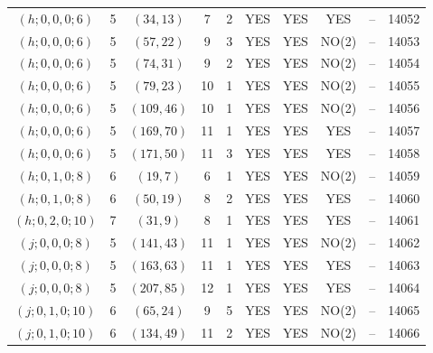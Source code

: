 \begin{longtable}{|c|c|c|c|c|c|c|c|c|c|}
$(h; 0, 0, 0; 6)$ & 5 & $(34, 13)$ & 7 & 2 & YES & YES & YES & -- & 14052\\
$(h; 0, 0, 0; 6)$ & 5 & $(57, 22)$ & 9 & 3 & YES & YES & NO(2) & -- & 14053\\
$(h; 0, 0, 0; 6)$ & 5 & $(74, 31)$ & 9 & 2 & YES & YES & NO(2) & -- & 14054\\
$(h; 0, 0, 0; 6)$ & 5 & $(79, 23)$ & 10 & 1 & YES & YES & NO(2) & -- & 14055\\
$(h; 0, 0, 0; 6)$ & 5 & $(109, 46)$ & 10 & 1 & YES & YES & NO(2) & -- & 14056\\
$(h; 0, 0, 0; 6)$ & 5 & $(169, 70)$ & 11 & 1 & YES & YES & YES & -- & 14057\\
$(h; 0, 0, 0; 6)$ & 5 & $(171, 50)$ & 11 & 3 & YES & YES & YES & -- & 14058\\
$(h; 0, 1, 0; 8)$ & 6 & $(19, 7)$ & 6 & 1 & YES & YES & NO(2) & -- & 14059\\
$(h; 0, 1, 0; 8)$ & 6 & $(50, 19)$ & 8 & 2 & YES & YES & YES & -- & 14060\\
$(h; 0, 2, 0; 10)$ & 7 & $(31, 9)$ & 8 & 1 & YES & YES & YES & -- & 14061\\
$(j; 0, 0, 0; 8)$ & 5 & $(141, 43)$ & 11 & 1 & YES & YES & NO(2) & -- & 14062\\
$(j; 0, 0, 0; 8)$ & 5 & $(163, 63)$ & 11 & 1 & YES & YES & YES & -- & 14063\\
$(j; 0, 0, 0; 8)$ & 5 & $(207, 85)$ & 12 & 1 & YES & YES & YES & -- & 14064\\
$(j; 0, 1, 0; 10)$ & 6 & $(65, 24)$ & 9 & 5 & YES & YES & NO(2) & -- & 14065\\
$(j; 0, 1, 0; 10)$ & 6 & $(134, 49)$ & 11 & 2 & YES & YES & NO(2) & -- & 14066
\end{longtable}
